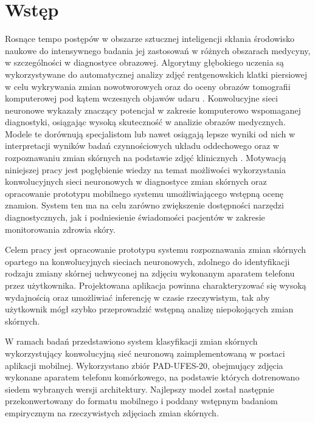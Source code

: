 
\def\filename{wstep}
\chapter{Wstęp}
Rosnące tempo postępów w obszarze sztucznej inteligencji skłania środowisko naukowe do intensywnego badania jej zastosowań w różnych obszarach medycyny, w szczególności w diagnostyce obrazowej.
Algorytmy głębokiego uczenia są wykorzystywane do automatycznej analizy zdjęć rentgenowskich klatki piersiowej w celu wykrywania zmian nowotworowych oraz do oceny obrazów tomografii komputerowej pod kątem wczesnych objawów udaru \cite{lee_validation_2023, 10.1117/12.2216307, KARTHIK2020105728}.
Konwolucyjne sieci neuronowe wykazały znaczący potencjał w zakresie komputerowo wspomaganej diagnostyki, osiągając wysoką skuteczność w analizie obrazów medycznych.
Modele te dorównują specjalistom lub nawet osiągają lepsze wyniki od nich w interpretacji wyników badań czynnościowych układu oddechowego oraz w rozpoznawaniu zmian skórnych na podstawie zdjęć klinicznych \cite{BRINKER201947, topalovic_artificial_2019}.
Motywacją niniejszej pracy jest pogłębienie wiedzy na temat możliwości wykorzystania konwolucyjnych sieci neuronowych w diagnostyce zmian skórnych oraz opracowanie prototypu mobilnego systemu umożliwiającego wstępną ocenę znamion.
System ten ma na celu zarówno zwiększenie dostępności narzędzi diagnostycznych, jak i podniesienie świadomości pacjentów w zakresie monitorowania zdrowia skóry.

Celem pracy jest opracowanie prototypu systemu rozpoznawania zmian skórnych opartego na konwolucyjnych sieciach neuronowych, zdolnego do identyfikacji rodzaju zmiany skórnej uchwyconej na zdjęciu wykonanym aparatem telefonu przez użytkownika.
Projektowana aplikacja powinna charakteryzować się wysoką wydajnością oraz umożliwiać inferencję w czasie rzeczywistym, tak aby użytkownik mógł szybko przeprowadzić wstępną analizę niepokojących zmian skórnych.

W ramach badań przedstawiono system klasyfikacji zmian skórnych wykorzystujący konwolucyjną sieć neuronową zaimplementowaną w postaci aplikacji mobilnej. 
Wykorzystano zbiór PAD-UFES-20, obejmujący zdjęcia wykonane aparatem telefonu komórkowego, na podstawie których dotrenowano siedem wybranych wersji architektury.
Najlepszy model został następnie przekonwertowany do formatu mobilnego i poddany wstępnym badaniom empirycznym na rzeczywistych zdjęciach zmian skórnych.

